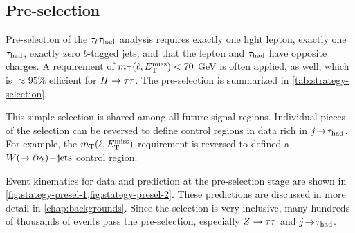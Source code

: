 \subsection{Pre-selection}
\label{sec:strategy-preselection}

Pre-selection of the $\tau_\ell\tau_\text{had}$ analysis requires exactly one light lepton, exactly one $\tau_\text{had}$, exactly zero $b$-tagged jets, and that the lepton and $\tau_\text{had}$ have opposite charges. A requirement of $m_\text{T}(\ell, E_{\mathrm{T}}^{\mathrm{miss}}) < 70$ GeV is often applied, as well, which is $\approx\!95$\% efficient for $H\rightarrow\tau\tau$. The pre-selection is summarized in \cref{tab:strategy-selection}.

This simple selection is shared among all future signal regions. Individual pieces of the selection can be reversed to define control regions in data rich in $j\!\rightarrow\!\tau_\text{had}$. For example, the $m_\text{T}(\ell, E_{\mathrm{T}}^{\mathrm{miss}})$ requirement is reversed to defined a $W (\rightarrow \ell\nu_\ell)\!+\!\text{jets}$ control region.

Event kinematics for data and prediction at the pre-selection stage are shown in \cref{fig:stategy-presel-1,fig:stategy-presel-2}. These predictions are discussed in more detail in \cref{chap:backgrounds}. Since the selection is very inclusive, many hundreds of thousands of events pass the pre-selection, especially $Z\rightarrow\tau\tau$ and $j\!\rightarrow\!\tau_\text{had}$.

\clearpage

